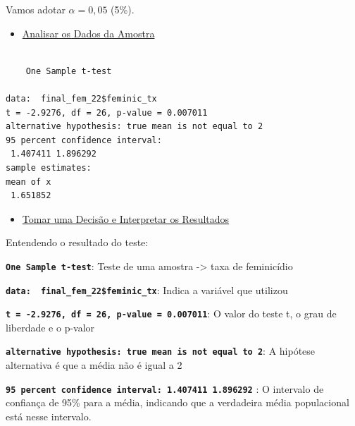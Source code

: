 \documentclass[
  letterpaper,
  DIV=11,
  numbers=noendperiod]{scrreprt}
\newenvironment{Shaded}{\begin{snugshade}}{\end{snugshade}}
\newcommand{\AttributeTok}[1]{\textcolor[rgb]{0.40,0.45,0.13}{#1}}
\newcommand{\ConstantTok}[1]{\textcolor[rgb]{0.56,0.35,0.01}{#1}}
\newcommand{\DecValTok}[1]{\textcolor[rgb]{0.68,0.00,0.00}{#1}}
\newcommand{\FloatTok}[1]{\textcolor[rgb]{0.68,0.00,0.00}{#1}}
\newcommand{\FunctionTok}[1]{\textcolor[rgb]{0.28,0.35,0.67}{#1}}
\newcommand{\NormalTok}[1]{\textcolor[rgb]{0.00,0.23,0.31}{#1}}
\newcommand{\SpecialCharTok}[1]{\textcolor[rgb]{0.37,0.37,0.37}{#1}}
\newcommand{\StringTok}[1]{\textcolor[rgb]{0.13,0.47,0.30}{#1}}
\providecommand{\tightlist}{%
  \setlength{\itemsep}{0pt}\setlength{\parskip}{0pt}}
\begin{document}
Vamos adotar \(\alpha= 0,05\) (5\%).

\begin{itemize}
\tightlist
\item
  \ul{Analisar os Dados da Amostra}
\end{itemize}

\begin{Shaded}
\end{Shaded}

\begin{verbatim}

    One Sample t-test

data:  final_fem_22$feminic_tx
t = -2.9276, df = 26, p-value = 0.007011
alternative hypothesis: true mean is not equal to 2
95 percent confidence interval:
 1.407411 1.896292
sample estimates:
mean of x 
 1.651852 
\end{verbatim}

\begin{itemize}
\tightlist
\item
  \ul{Tomar uma Decisão e Interpretar os Resultados}
\end{itemize}

Entendendo o resultado do teste:

\textbf{\texttt{One\ Sample\ t-test}}: Teste de uma amostra
-\textgreater{} taxa de feminicídio

\textbf{\texttt{data:\ \ final\_fem\_22\$feminic\_tx}}: Indica a
variável que utilizou

\textbf{\texttt{t\ =\ -2.9276,\ df\ =\ 26,\ p-value\ =\ 0.007011}}: O
valor do teste t, o grau de liberdade e o p-valor

\textbf{\texttt{alternative\ hypothesis:\ true\ mean\ is\ not\ equal\ to\ 2}}:
A hipótese alternativa é que a média não é igual a 2

\textbf{\texttt{95\ percent\ confidence\ interval:\ 1.407411\ 1.896292}}
: O intervalo de confiança de 95\% para a média, indicando que a
verdadeira média populacional está nesse intervalo.
\end{document}
